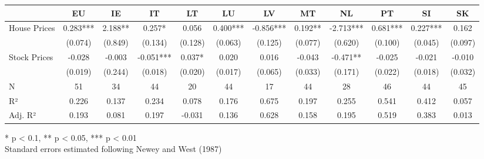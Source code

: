\begin{table}[h]
\fontsize{7.5pt}{9.0pt}\selectfont
\begin{tabular*}{\linewidth}{@{\extracolsep{\fill}}lccccccccccc}
\toprule
  & EU & IE & IT & LT & LU & LV & MT & NL & PT & SI & SK \\ 
\midrule\addlinespace[2.5pt]
House Prices & 0.283*** & 2.188** & 0.257* & 0.056 & 0.400*** & -0.856*** & 0.192** & -2.713*** & 0.681*** & 0.227*** & 0.162 \\ 
 & (0.074) & (0.849) & (0.134) & (0.128) & (0.063) & (0.125) & (0.077) & (0.620) & (0.100) & (0.045) & (0.097) \\ 
Stock Prices & -0.028 & -0.003 & -0.051*** & 0.037* & 0.020 & 0.016 & -0.043 & -0.471** & -0.025 & -0.021 & -0.010 \\ 
{} & {(0.019)} & {(0.244)} & {(0.018)} & {(0.020)} & {(0.017)} & {(0.065)} & {(0.033)} & {(0.171)} & {(0.022)} & {(0.018)} & {(0.032)} \\ 
N & 51 & 34 & 44 & 20 & 44 & 17 & 44 & 28 & 46 & 44 & 45 \\ 
R² & 0.226 & 0.137 & 0.234 & 0.078 & 0.176 & 0.675 & 0.197 & 0.255 & 0.541 & 0.412 & 0.057 \\ 
Adj. R² & 0.193 & 0.081 & 0.197 & -0.031 & 0.136 & 0.628 & 0.158 & 0.195 & 0.519 & 0.383 & 0.013 \\ 
\bottomrule
\end{tabular*}
\begin{minipage}{\linewidth}
* p < 0.1, ** p < 0.05, *** p < 0.01\\
Standard errors estimated following Newey and West (1987)\\
\end{minipage}
\end{table}

